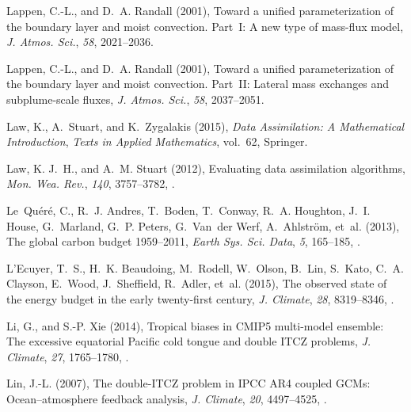 \documentclass[draft]{agujournal}
\begin{document}
\begin{thebibliography}{196}
Lappen, C.-L., and D.~A. Randall (2001{}), Toward a unified
  parameterization of the boundary layer and moist convection. {P}art~{I}: A
  new type of mass-flux model, \textit{J. Atmos. Sci.}, \textit{58},
  2021--2036.

Lappen, C.-L., and D.~A. Randall (2001{}), Toward a unified
  parameterization of the boundary layer and moist convection. {P}art~{II}:
  Lateral mass exchanges and subplume-scale fluxes, \textit{J. Atmos. Sci.},
  \textit{58}, 2037--2051.

Law, K., A.~Stuart, and K.~Zygalakis (2015), \textit{Data Assimilation: A
  Mathematical Introduction}, \textit{Texts in Applied Mathematics}, vol.~62,
  Springer.

Law, K. J.~H., and A.~M. Stuart (2012), Evaluating data assimilation
  algorithms, \textit{Mon. Wea. Rev.}, \textit{140}, 3757--3782,
  .

Le~Qu{\'e}r{\'e}, C., R.~J. Andres, T.~Boden, T.~Conway, R.~A. Houghton, J.~I.
  House, G.~Marland, G.~P. Peters, G.~Van~der Werf, A.~Ahlstr{\"o}m, et~al.
  (2013), The global carbon budget 1959--2011, \textit{Earth Sys. Sci. Data},
  \textit{5}, 165--185, .

L'Ecuyer, T.~S., H.~K. Beaudoing, M.~Rodell, W.~Olson, B.~Lin, S.~Kato, C.~A.
  Clayson, E.~Wood, J.~Sheffield, R.~Adler, et~al. (2015), The observed state
  of the energy budget in the early twenty-first century, \textit{J. Climate},
  \textit{28}, 8319--8346, .

Li, G., and S.-P. Xie (2014), Tropical biases in {CMIP5} multi-model ensemble:
  The excessive equatorial {P}acific cold tongue and double {ITCZ} problems,
  \textit{J. Climate}, \textit{27}, 1765--1780,
  .

Lin, J.-L. (2007), The double-{ITCZ} problem in {IPCC} {AR4} coupled {GCM}s:
  Ocean--atmosphere feedback analysis, \textit{J. Climate}, \textit{20},
  4497--4525, .


\end{thebibliography}
\end{document}
